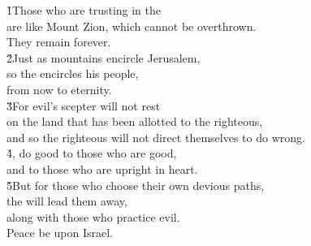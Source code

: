\begin{poetry}
\poeml \v{1}Those who are trusting in the  \\
\poemll    are like Mount Zion, which cannot be overthrown. \\
\poemlll       They remain forever. \\
\poeml \v{2}Just as mountains encircle Jerusalem, \\
\poemll    so the  encircles his people, \\
\poemlll       from now to eternity. \\
\poeml \v{3}For evil's scepter will not rest \\
\poemll    on the land that has been allotted to the righteous, \\
\poeml and so the righteous will not direct themselves to do wrong. \\
\poeml \v{4}, do good to those who are good, \\
\poemll    and to those who are upright in heart. \\
\poeml \v{5}But for those who choose their own devious paths, \\
\poemll    the  will lead them away, \\
\poemlll       along with those who practice evil. \\
\poeml Peace be upon Israel.
\end{poetry}

